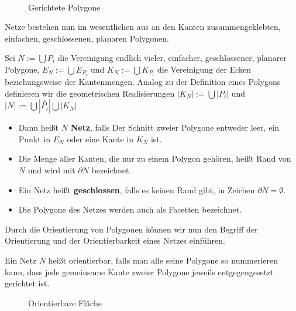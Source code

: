 \begin{figure}[H]
    \centering
     \\
    
    \caption{Gerichtete Polygone}
    \label{fig:polygon-oriented}
\end{figure}

Netze bestehen nun im wesentlichen aus an den Kanten zusammengeklebten, einfachen, geschlossenen, planaren Polygonen.

\begin{Definition}
Sei $N:= \bigcup P_i$ die Vereinigung endlich vieler, einfacher, geschlossener, planarer Polygone, 
$E_N := \bigcup E_{P_i}$ und $K_N := \bigcup K_{P_i}$ die Vereinigung der Ecken beziehungsweise der Kantenmengen.
Analog zu der Definition eines Polygons definieren wir die geometrischen Realisierungen 
$|K_N| := \bigcup |P_i|$ und $|N| := \bigcup |\overset{\circ}{P_i}| \bigcup |K_N|$
\begin{itemize}
\item Dann heißt $N$ \textbf{Netz}, falls Der Schnitt zweier Polygone entweder leer, ein Punkt in $E_N$ oder eine Kante in $K_N$ ist. 

\item Die Menge aller Kanten, die nur zu einem Polygon gehören, heißt Rand von $N$ und wird mit $\partial N$ bezeichnet.
\item Ein Netz heißt \textbf{geschlossen}, falls es keinen Rand gibt, in Zeichen $\partial N = \emptyset$. 
\item Die Polygone des Netzes werden auch als Facetten bezeichnet.
\end{itemize}
\end{Definition} 


Durch die  Orientierung von Polygonen können wir nun den Begriff der Orientierung und der Orientierbarkeit eines Netzes einführen.

\begin{Definition}
Ein Netz $N$ heißt orientierbar, falls man alle seine Polygone so nummerieren kann, dass jede gemeinsame Kante zweier Polygone jeweils entgegengesetzt gerichtet ist. 
\end{Definition}


\begin{figure}[H]
    \centering
    
    \caption{Orientierbare Fläche}
    \label{fig:surface-orientable}
\end{figure}

